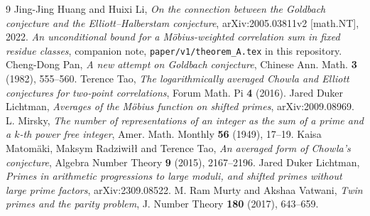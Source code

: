 \documentclass[11pt,a4paper]{article}
\theoremstyle{plain}
\theoremstyle{definition}
\begin{document}
\begin{thebibliography}{9}
 Jing-Jing Huang and Huixi Li, \emph{On the connection
between the Goldbach conjecture and the Elliott--Halberstam
conjecture}, arXiv:2005.03811v2 [math.NT], 2022.
 \emph{An unconditional bound for a M\"obius-weighted
correlation sum in fixed residue classes}, companion note,
\texttt{paper/v1/theorem\_A.tex} in this repository.
 Cheng-Dong Pan, \emph{A new attempt on Goldbach
conjecture}, Chinese Ann. Math. \textbf{3} (1982), 555--560.
 Terence Tao, \emph{The logarithmically averaged Chowla
and Elliott conjectures for two-point correlations}, Forum Math. Pi
\textbf{4} (2016).
 Jared Duker Lichtman, \emph{Averages of the M\"obius
function on shifted primes}, arXiv:2009.08969.
 L. Mirsky, \emph{The number of representations
of an integer as the sum of a prime and a $k$-th power free
integer}, Amer. Math. Monthly \textbf{56} (1949), 17--19.
 Kaisa Matom\"aki, Maksym Radziwi\l{}\l{}
and Terence Tao, \emph{An averaged form of Chowla's conjecture},
Algebra Number Theory \textbf{9} (2015), 2167--2196.
 Jared Duker Lichtman, \emph{Primes in arithmetic
progressions to large moduli, and shifted primes without large prime
factors}, arXiv:2309.08522.
 M. Ram Murty and Akshaa Vatwani, \emph{Twin primes and
the parity problem}, J. Number Theory \textbf{180} (2017), 643--659.
\end{thebibliography}
\end{document}
